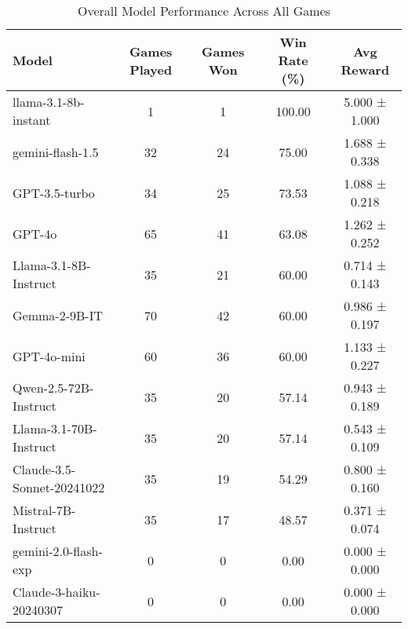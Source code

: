 \begin{table}[htbp]
\centering
\caption{Overall Model Performance Across All Games}
\begin{tabular}{lcccc}
\toprule
Model & Games Played & Games Won & Win Rate (\%) & Avg Reward \\
\midrule
llama-3.1-8b-instant & 1 & 1 & 100.00 & 5.000 ± 1.000 \\
gemini-flash-1.5 & 32 & 24 & 75.00 & 1.688 ± 0.338 \\
GPT-3.5-turbo & 34 & 25 & 73.53 & 1.088 ± 0.218 \\
GPT-4o & 65 & 41 & 63.08 & 1.262 ± 0.252 \\
Llama-3.1-8B-Instruct & 35 & 21 & 60.00 & 0.714 ± 0.143 \\
Gemma-2-9B-IT & 70 & 42 & 60.00 & 0.986 ± 0.197 \\
GPT-4o-mini & 60 & 36 & 60.00 & 1.133 ± 0.227 \\
Qwen-2.5-72B-Instruct & 35 & 20 & 57.14 & 0.943 ± 0.189 \\
Llama-3.1-70B-Instruct & 35 & 20 & 57.14 & 0.543 ± 0.109 \\
Claude-3.5-Sonnet-20241022 & 35 & 19 & 54.29 & 0.800 ± 0.160 \\
Mistral-7B-Instruct & 35 & 17 & 48.57 & 0.371 ± 0.074 \\
gemini-2.0-flash-exp & 0 & 0 & 0.00 & 0.000 ± 0.000 \\
Claude-3-haiku-20240307 & 0 & 0 & 0.00 & 0.000 ± 0.000 \\
\bottomrule
\end{tabular}
\end{table}

